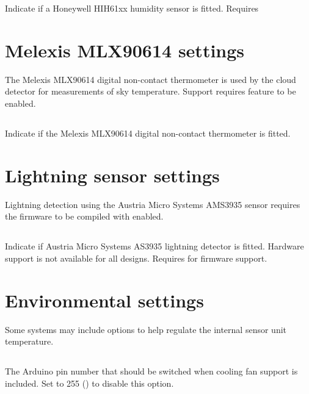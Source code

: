 Indicate if a Honeywell HIH61xx humidity sensor is fitted. Requires


\section{Melexis MLX90614 settings}

The Melexis MLX90614 digital non-contact thermometer is used by the
cloud detector for measurements of sky temperature. Support requires
 feature to be enabled.


\subsection[mlx90614-present]{}

Indicate if the Melexis MLX90614 digital non-contact thermometer is fitted.

\section{Lightning sensor settings}

Lightning detection using the Austria Micro Systems AMS3935 sensor
requires the firmware to be compiled with 
enabled.

\subsection[as3935-present]{}
Indicate if Austria Micro Systems AS3935 lightning detector is
fitted. Hardware support is not available for all designs. Requires
 for firmware support.


\section{Environmental settings}
Some systems may include options to help regulate the internal sensor
unit temperature.

\subsection[fan-pin]{}
The Arduino pin number that should be switched when cooling fan
support is included. Set to 255 () to
disable this option.


